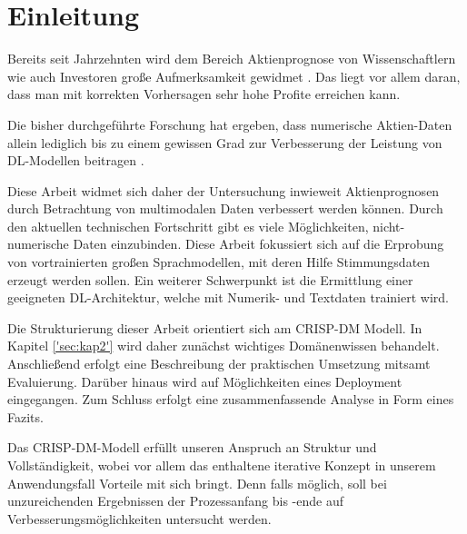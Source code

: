 \section{Einleitung}\label{sec:einleitung}

Bereits seit Jahrzehnten wird dem Bereich Aktienprognose von Wissenschaftlern wie auch Investoren große Aufmerksamkeit gewidmet \autocite[Kap. Introduction]{zhang2022transformer}. Das liegt vor allem daran, dass man mit korrekten Vorhersagen sehr hohe Profite erreichen kann.

Die bisher durchgeführte Forschung hat ergeben, dass numerische Aktien-Daten allein lediglich bis zu einem gewissen Grad zur Verbesserung der Leistung von \ac{DL}-Modellen beitragen \autocite[Kap. Introduction]{zhang2022transformer}.

Diese Arbeit widmet sich daher der Untersuchung inwieweit Aktienprognosen durch Betrachtung von multimodalen Daten verbessert werden können. Durch den aktuellen technischen Fortschritt gibt es viele Möglichkeiten, nicht-numerische Daten einzubinden. Diese Arbeit fokussiert sich auf die Erprobung von vortrainierten großen Sprachmodellen, mit deren Hilfe Stimmungsdaten erzeugt werden sollen. Ein weiterer Schwerpunkt ist die Ermittlung einer geeigneten \ac{DL}-Architektur, welche mit Numerik- und Textdaten trainiert wird.

Die Strukturierung dieser Arbeit orientiert sich am \ac{CRISP-DM} Modell. In Kapitel \ref{'sec:kap2'} wird daher zunächst wichtiges Domänenwissen behandelt. Anschließend erfolgt eine Beschreibung der praktischen Umsetzung mitsamt Evaluierung. Darüber hinaus wird auf Möglichkeiten eines Deployment eingegangen. Zum Schluss erfolgt eine zusammenfassende Analyse in Form eines Fazits. 

Das \ac{CRISP-DM}-Modell erfüllt unseren Anspruch an Struktur und Vollständigkeit, wobei vor allem das enthaltene iterative Konzept in unserem Anwendungsfall Vorteile mit sich bringt. Denn falls möglich, soll bei unzureichenden Ergebnissen der Prozessanfang bis -ende auf Verbesserungsmöglichkeiten untersucht werden.